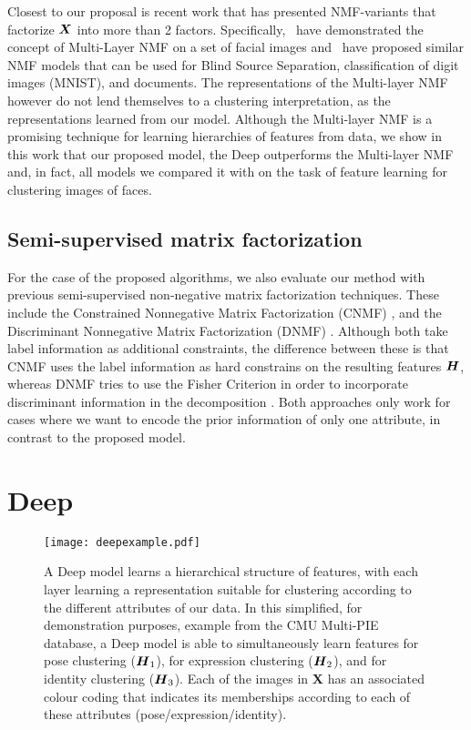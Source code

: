 \documentclass[10pt,journal,compsoc]{IEEEtran}
\begin{document}
Closest to our proposal is recent work that has presented NMF-variants that factorize $\boldsymbol X$ into more than 2 factors. Specifically,~\citet{ahn2004multiplicative} have demonstrated the concept of Multi-Layer NMF on a set of facial images and~\cite{lyu2013algorithms,Cichocki06multilayernonnegative,song2013hierarchical} have proposed similar NMF models that can be used for Blind Source Separation, classification of digit images (MNIST), and documents. The representations of the Multi-layer NMF however do not lend themselves to a clustering interpretation, as the representations learned from our model.
Although the Multi-layer NMF is a promising technique for learning hierarchies of features from data, we show in this work that our proposed model, the Deep \seminmf outperforms the Multi-layer NMF and, in fact, all models we compared it with on the task of feature learning for clustering images of faces. 

\subsection{Semi-supervised matrix factorization}


For the case of the proposed \dwsf{} algorithms, we also evaluate our method with previous semi-supervised non-negative matrix factorization techniques. These include the Constrained Nonnegative Matrix Factorization ({CNMF}) \cite{Liu2012}, and the Discriminant Nonnegative Matrix Factorization (DNMF) \cite{Kotsia2007}. Although both take label information as additional constraints, the difference between these is that CNMF uses the label information as hard constrains on the resulting features $\boldsymbol{H}$, whereas DNMF tries to use the Fisher Criterion in order to incorporate discriminant information  in the decomposition \cite{Kotsia2007}. Both approaches only work for cases where we want to encode the prior information of only one attribute, in contrast to the proposed \dwsf{} model.

\section{Deep \seminmf}\label{sec:deepseminmf}

\begin{figure*}
  \begin{center}
      \texttt{[image: deepexample.pdf]}      
  \end{center}
  \caption{A Deep \seminmf model learns a hierarchical structure of features, with each layer learning a representation suitable for clustering according to the different attributes of our data. In this simplified, for demonstration purposes, example from the CMU Multi-PIE database, a Deep \seminmf model is able to simultaneously learn features for pose clustering ($\boldsymbol H_1$), for expression clustering ($\boldsymbol H_2$), and for identity clustering ($\boldsymbol H_3$). Each of the images in {\bf X} has an associated colour coding that indicates its memberships according to each of these attributes (pose/expression/identity).}
  \label{fig:intuition}
\end{figure*}
\end{document}
